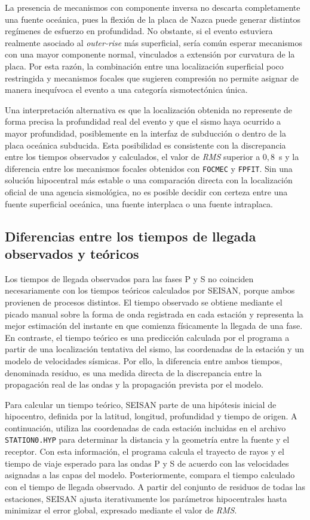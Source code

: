 \documentclass[a4paper,12pt]{article} %
\numberwithin{equation}{section} %
\numberwithin{figure}{section} %
\begin{document}
La presencia de mecanismos con componente inversa no descarta completamente una fuente oceánica, pues la flexión de la placa de Nazca puede generar distintos regímenes de esfuerzo en profundidad. No obstante, si el evento estuviera realmente asociado al \emph{outer-rise} más superficial, sería común esperar mecanismos con una mayor componente normal, vinculados a extensión por curvatura de la placa. Por esta razón, la combinación entre una localización superficial poco restringida y mecanismos focales que sugieren compresión no permite asignar de manera inequívoca el evento a una categoría sismotectónica única.

Una interpretación alternativa es que la localización obtenida no represente de forma precisa la profundidad real del evento y que el sismo haya ocurrido a mayor profundidad, posiblemente en la interfaz de subducción o dentro de la placa oceánica subducida. Esta posibilidad es consistente con la discrepancia entre los tiempos observados y calculados, el valor de \textit{RMS} superior a $0{,}8$~s y la diferencia entre los mecanismos focales obtenidos con \texttt{FOCMEC} y \texttt{FPFIT}. Sin una solución hipocentral más estable o una comparación directa con la localización oficial de una agencia sismológica, no es posible decidir con certeza entre una fuente superficial oceánica, una fuente interplaca o una fuente intraplaca.

\newpage

\subsection{Diferencias entre los tiempos de llegada observados y teóricos}

Los tiempos de llegada observados para las fases P y S no coinciden necesariamente con los tiempos teóricos calculados por SEISAN, porque ambos provienen de procesos distintos. El tiempo observado se obtiene mediante el picado manual sobre la forma de onda registrada en cada estación y representa la mejor estimación del instante en que comienza físicamente la llegada de una fase. En contraste, el tiempo teórico es una predicción calculada por el programa a partir de una localización tentativa del sismo, las coordenadas de la estación y un modelo de velocidades sísmicas. Por ello, la diferencia entre ambos tiempos, denominada residuo, es una medida directa de la discrepancia entre la propagación real de las ondas y la propagación prevista por el modelo.

Para calcular un tiempo teórico, SEISAN parte de una hipótesis inicial de hipocentro, definida por la latitud, longitud, profundidad y tiempo de origen. A continuación, utiliza las coordenadas de cada estación incluidas en el archivo \texttt{STATION0.HYP} para determinar la distancia y la geometría entre la fuente y el receptor. Con esta información, el programa calcula el trayecto de rayos y el tiempo de viaje esperado para las ondas P y S de acuerdo con las velocidades asignadas a las capas del modelo. Posteriormente, compara el tiempo calculado con el tiempo de llegada observado. A partir del conjunto de residuos de todas las estaciones, SEISAN ajusta iterativamente los parámetros hipocentrales hasta minimizar el error global, expresado mediante el valor de \textit{RMS}.
\end{document}
